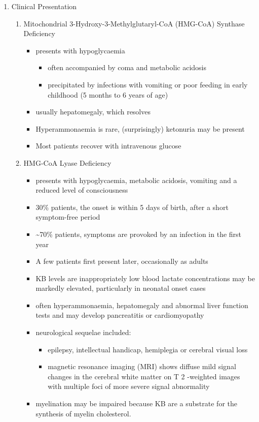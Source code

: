 \documentclass{scrartcl}
\begin{document}
\begin{enumerate}
\item Clinical Presentation
\label{sec:org83e82e2}
\begin{enumerate}
\item Mitochondrial 3-Hydroxy-3-Methylglutaryl-CoA (HMG-CoA) Synthase Deficiency
\label{sec:orge865dbb}
\begin{itemize}
\item presents with hypoglycaemia
\begin{itemize}
\item often accompanied by coma and metabolic acidosis
\item precipitated by infections with vomiting or poor feeding in early
childhood (5 months to 6 years of age)
\end{itemize}
\item usually hepatomegaly, which resolves
\item Hyperammonaemia is rare, (surprisingly) ketonuria may be present
\item Most patients recover with intravenous glucose
\end{itemize}

\item HMG-CoA Lyase Deficiency
\label{sec:org99ea33e}
\begin{itemize}
\item presents with hypoglycaemia, metabolic acidosis, vomiting and a
reduced level of consciousness
\item 30\% patients, the onset is within 5 days of birth, after a short symptom-free period
\item \textasciitilde{}70\% patients, symptoms are provoked by an infection in the first year
\item A few patients first present later, occasionally as adults
\item KB levels are inappropriately low blood lactate concentrations
may be markedly elevated, particularly in neonatal onset cases
\item often hyperammonaemia, hepatomegaly and abnormal liver function tests and
may develop pancreatitis or cardiomyopathy
\item neurological sequelae included:
\begin{itemize}
\item epilepsy, intellectual handicap, hemiplegia or cerebral visual loss
\item magnetic resonance imaging (MRI) shows diffuse mild signal changes
in the cerebral white matter on T 2 -weighted images with multiple
foci of more severe signal abnormality
\end{itemize}
\item myelination may be impaired because KB are a substrate for the
synthesis of myelin cholesterol.
\end{itemize}
\end{enumerate}


\end{enumerate}
\end{document}
